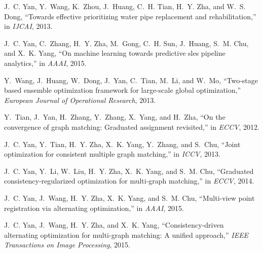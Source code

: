 \documentclass[10pt,conference]{IEEEtran}
\begin{document}
\begin{thebibliography}{10}
J.~C. Yan, Y.~Wang, K.~Zhou, J.~Huang, C.~H. Tian, H.~Y. Zha, and W.~S. Dong,
  ``Towards effective prioritizing water pipe replacement and rehabilitation,''
  in \emph{IJCAI}, 2013.

J.~C. Yan, C.~Zhang, H.~Y. Zha, M.~Gong, C.~H. Sun, J.~Huang, S.~M. Chu, and
  X.~K. Yang, ``On machine learning towards predictive sles pipeline
  analytics,'' in \emph{AAAI}, 2015.

Y.~Wang, J.~Huang, W.~Dong, J.~Yan, C.~Tian, M.~Li, and W.~Mo, ``Two-stage
  based ensemble optimization framework for large-scale global optimization,''
  \emph{European Journal of Operational Research}, 2013.

Y.~Tian, J.~Yan, H.~Zhang, Y.~Zhang, X.~Yang, and H.~Zha, ``On the convergence
  of graph matching: Graduated assignment revisited,'' in \emph{ECCV}, 2012.

J.~C. Yan, Y.~Tian, H.~Y. Zha, X.~K. Yang, Y.~Zhang, and S.~Chu, ``Joint
  optimization for consistent multiple graph matching,'' in \emph{ICCV}, 2013.

J.~C. Yan, Y.~Li, W.~Liu, H.~Y. Zha, X.~K. Yang, and S.~M. Chu, ``Graduated
  consistency-regularized optimization for multi-graph matching,'' in
  \emph{ECCV}, 2014.

J.~C. Yan, J.~Wang, H.~Y. Zha, X.~K. Yang, and S.~M. Chu, ``Multi-view point
  registration via alternating optimization,'' in \emph{AAAI}, 2015.

J.~C. Yan, J.~Wang, H.~Y. Zha, and X.~K. Yang, ``Consistency-driven alternating
  optimization for multi-graph matching: A unified approach,'' \emph{IEEE
  Transactions on Image Processing}, 2015.

\end{thebibliography}
\end{document}
